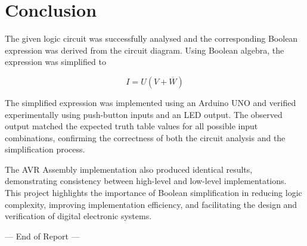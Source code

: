 \documentclass[12pt,a4paper]{article}
\begin{document}
\section{Conclusion}

The given logic circuit was successfully analysed and the corresponding Boolean
expression was derived from the circuit diagram. Using Boolean algebra, the
expression was simplified to

\[
I = U(V + \overline{W})
\]

The simplified expression was implemented using an Arduino UNO and verified
experimentally using push-button inputs and an LED output. The observed output
matched the expected truth table values for all possible input combinations,
confirming the correctness of both the circuit analysis and the simplification
process.

The AVR Assembly implementation also produced identical results, demonstrating
consistency between high-level and low-level implementations. This project
highlights the importance of Boolean simplification in reducing logic complexity,
improving implementation efficiency, and facilitating the design and verification
of digital electronic systems.

\vfill
\begin{center}
  \textcolor{MidGray}{\small --- End of Report ---}
\end{center}
\end{document}

